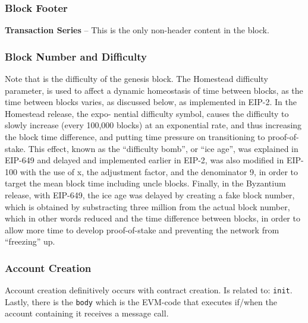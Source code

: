 \documentclass[10pt,a4paper,leqno,bibliography=totoc]{scrartcl}
\newenvironment{alphafootnotes}
{\par\edef\savedfootnotenumber{\number\value{footnote}}
\renewcommand{\thefootnote}{\alph{footnote}}
\setcounter{footnote}{0}}
{\par\setcounter{footnote}{\savedfootnotenumber}}
\begin{document}
\begin{alphafootnotes}
\begin{multicols*}{2}
\begin{enumerate}
					\end{enumerate}
				
					\subsubsection{Block Footer}
					\item \textbf{Transaction Series} -- This is the only non-header content in the block.
					
					\subsubsection{Block Number and Difficulty}
						Note that is the difficulty of the genesis block. The Homestead difficulty parameter, is used to affect a dynamic homeostasis of time between blocks, as the time between blocks varies, as discussed below, as implemented in EIP-2. In the Homestead release, the expo- nential difficulty symbol, causes the difficulty to slowly increase (every 100,000 blocks) at an exponential rate, and thus increasing the block time difference, and putting time pressure on transitioning to proof-of-stake. This effect, known as the “difficulty bomb”, or “ice age”, was explained in EIP-649 and delayed and implemented earlier in EIP-2, was also modified in EIP-100 with the use of x, the adjustment factor, and the denominator 9, in order to target the mean block time including uncle blocks. Finally, in the Byzantium release, with EIP-649, the ice age was delayed by creating a fake block number, which is obtained by substracting three million from the actual block number, which in other words reduced and the time difference between blocks, in order to allow more time to develop proof-of-stake and preventing the network from “freezing” up.\supercite{Wood2017}
					
					\subsubsection{Account Creation} 

					Account creation definitively occurs with contract creation. Is related to: \texttt{init}. Lastly, there is the \texttt{body} which is the EVM-code that executes if/when the account containing it receives a message call.


\end{multicols*}
\end{alphafootnotes}
\end{document}
